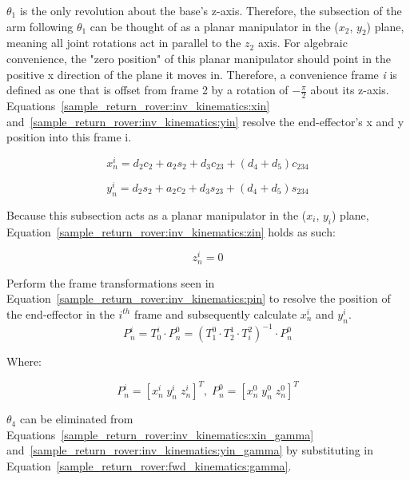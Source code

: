 $\theta_{1}$ is the only revolution about the base's z-axis. Therefore, the subsection of the arm following $\theta_{1}$ can be thought of as a planar manipulator in the ($x_{2}$, $y_{2}$) plane, meaning all joint rotations act in parallel to the $z_{2}$ axis. For algebraic convenience, the "zero position" of this planar manipulator should point in the positive x direction of the plane it moves in. Therefore, a convenience frame \textit{i} is defined as one that is offset from frame 2 by a rotation of $-\frac{\pi}{2}$ about its z-axis. Equations~\ref{sample_return_rover:inv_kinematics:xin} and~\ref{sample_return_rover:inv_kinematics:yin} resolve the end-effector's x and y position into this frame i.

\begin{equation}\label{sample_return_rover:inv_kinematics:xin}
	x^{i}_{n} = d_{2}c_{2}+a_{2}s_{2}+d_{3}c_{23}+(d_{4}+d_{5})c_{234}
\end{equation}

\begin{equation}\label{sample_return_rover:inv_kinematics:yin}
	y^{i}_{n}= d_{2}s_{2}+a_{2}c_{2}+d_{3}s_{23}+(d_{4}+d_{5})s_{234}
\end{equation}

Because this subsection acts as a planar manipulator in the ($x_{i}$, $y_{i}$) plane, Equation~\ref{sample_return_rover:inv_kinematics:zin} holds as such:

\begin{equation}\label{sample_return_rover:inv_kinematics:zin}
	z^{i}_{n} = 0
\end{equation}

Perform the frame transformations seen in Equation~\ref{sample_return_rover:inv_kinematics:pin} to resolve the position of the end-effector in the $i^{th}$ frame and subsequently calculate $x^{i}_{n}$ and $y^{i}_{n}$.
\begin{equation}\label{sample_return_rover:inv_kinematics:pin}
	P^{i}_{n} = T^{i}_{0}\cdot  P^{0}_{n}  = (T^{0}_{1}\cdot T^{1}_{2}\cdot T^{2}_{i})^{-1} \cdot P^{0}_{n}
\end{equation}

Where:

\begin{equation}\label{sample_return_rover:inv_kinematics:define_pin}
	P^{i}_{n} = [x^{i}_{n} \; y^{i}_{n} \; z^{i}_{n}]^T, \; P^{0}_{n} = [x^{0}_{n}\; y^{0}_{n}\; z^{0}_{n}]^T
\end{equation}

$\theta_{4}$ can be eliminated from Equations~\ref{sample_return_rover:inv_kinematics:xin_gamma} and~\ref{sample_return_rover:inv_kinematics:yin_gamma} by substituting in Equation~\ref{sample_return_rover:fwd_kinematics:gamma}.


